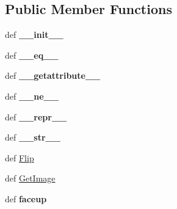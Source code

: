 \subsection*{Public Member Functions}
\begin{DoxyCompactItemize}
\item 
\hypertarget{classcards-with-friends_1_1card_1_1_card_a9a88beb1e241dc7392dd6f982fadc8c1}{def {\bfseries \-\_\-\-\_\-init\-\_\-\-\_\-}}\label{classcards-with-friends_1_1card_1_1_card_a9a88beb1e241dc7392dd6f982fadc8c1}

\item 
\hypertarget{classcards-with-friends_1_1card_1_1_card_ae903952193cd6f5bbd11efe200d17a65}{def {\bfseries \-\_\-\-\_\-eq\-\_\-\-\_\-}}\label{classcards-with-friends_1_1card_1_1_card_ae903952193cd6f5bbd11efe200d17a65}

\item 
\hypertarget{classcards-with-friends_1_1card_1_1_card_aa0346c601f6a98da90da1e9df60164aa}{def {\bfseries \-\_\-\-\_\-getattribute\-\_\-\-\_\-}}\label{classcards-with-friends_1_1card_1_1_card_aa0346c601f6a98da90da1e9df60164aa}

\item 
\hypertarget{classcards-with-friends_1_1card_1_1_card_a4804190fbe1caa433c0acf9f8c2c8945}{def {\bfseries \-\_\-\-\_\-ne\-\_\-\-\_\-}}\label{classcards-with-friends_1_1card_1_1_card_a4804190fbe1caa433c0acf9f8c2c8945}

\item 
\hypertarget{classcards-with-friends_1_1card_1_1_card_a2b39b6ee001d43e4a90507636731adb4}{def {\bfseries \-\_\-\-\_\-repr\-\_\-\-\_\-}}\label{classcards-with-friends_1_1card_1_1_card_a2b39b6ee001d43e4a90507636731adb4}

\item 
\hypertarget{classcards-with-friends_1_1card_1_1_card_a500c40c163e59f1eae7c873ad71adb1a}{def {\bfseries \-\_\-\-\_\-str\-\_\-\-\_\-}}\label{classcards-with-friends_1_1card_1_1_card_a500c40c163e59f1eae7c873ad71adb1a}

\item 
def \hyperlink{classcards-with-friends_1_1card_1_1_card_ae2d86ac3d92ee7e63536422e7a48f124}{Flip}
\item 
def \hyperlink{classcards-with-friends_1_1card_1_1_card_aaba3557054b73eff5188d46e875e2e79}{Get\-Image}
\item 
\hypertarget{classcards-with-friends_1_1card_1_1_card_a4687e29552edfb03fab617a4c080d4c2}{def {\bfseries faceup}}\label{classcards-with-friends_1_1card_1_1_card_a4687e29552edfb03fab617a4c080d4c2}


\end{DoxyCompactItemize}

